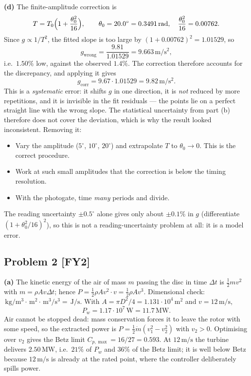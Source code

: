 \documentclass[11pt,a4paper]{article}
\newcommand{\problem}[2]{\subsection*{Problem #1 \; \textnormal{\small[#2]}}}
\newcommand{\unit}[1]{\,\mathrm{#1}}
\begin{document}
\textbf{(d)} The finite-amplitude correction is
\[
  T=T_0\Bigl(1+\frac{\theta_0^2}{16}\Bigr),\qquad
  \theta_0=20.0^\circ=0.3491\unit{rad},\quad
  \frac{\theta_0^2}{16}=0.00762 .
\]
Since $g\propto1/T^2$, the fitted slope is too large by
$(1+0.00762)^2=1.01529$, so
\[
  g_{\text{wrong}}=\frac{9.81}{1.01529}=9.663\unit{m/s^2},
\]
i.e.\ $1.50\%$ low, against the observed $1.4\%$. The correction therefore
accounts for the discrepancy, and applying it gives
\[
  g_{\text{corr}} = 9.67\cdot1.01529 = \boxed{9.82\unit{m/s^2}} .
\]
This is a \emph{systematic} error: it shifts $g$ in one direction, it is
\emph{not} reduced by more repetitions, and it is invisible in the fit
residuals --- the points lie on a perfect straight line with the wrong
slope. The statistical uncertainty from part (b) therefore does not cover
the deviation, which is why the result looked inconsistent. Removing it:
\begin{itemize}
\item Vary the amplitude ($5^\circ$, $10^\circ$, $20^\circ$) and extrapolate
      $T$ to $\theta_0\to0$. This is the correct procedure.
\item Work at such small amplitudes that the correction is below the
      timing resolution.
\item With the photogate, time \emph{many} periods and divide.
\end{itemize}
The reading uncertainty $\pm0.5^\circ$ alone gives only about
$\pm0.1\%$ in $g$ (differentiate $(1+\theta_0^2/16)^2$), so this is not a
reading-uncertainty problem at all: it is a model error.

\problem{2}{FY2}
\textbf{(a)} The kinetic energy of the air of mass $m$ passing the disc in
time $\Delta t$ is $\tfrac12mv^2$ with $m=\rho Av\Delta t$; hence
$P=\tfrac12\rho Av^2\cdot v=\tfrac12\rho A v^3$. Dimensional check:
$\unit{kg/m^3}\cdot\unit{m^2}\cdot\unit{m^3/s^3}=\unit{J/s}$.
With $A=\pi D^2/4=1.131\cdot10^{4}\unit{m^2}$ and $v=12\unit{m/s}$,
\[
  P_w = 1.17\cdot10^{7}\unit{W} = \boxed{11.7\unit{MW}}.
\]
Air cannot be stopped dead: mass conservation forces it to leave the rotor
with some speed, so the extracted power is
$P=\tfrac12\dot m(v_1^2-v_2^2)$ with $v_2>0$. Optimising over $v_2$ gives
the Betz limit $C_{p,\max}=16/27=0.593$. At $12\unit{m/s}$ the turbine
delivers $2.50\unit{MW}$, i.e.\ $21\%$ of $P_w$ and $36\%$ of the Betz
limit; it is well below Betz because $12\unit{m/s}$ is already at the rated
point, where the controller deliberately spills power.
\end{document}

